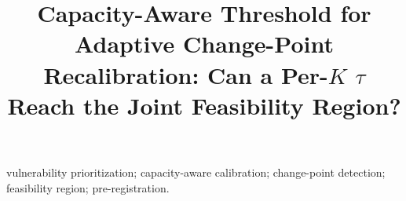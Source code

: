 \documentclass[journal]{IEEEtran}
\title{Capacity-Aware Threshold for Adaptive Change-Point
Recalibration: Can a Per-$K$ $\tau$ Reach the Joint Feasibility Region?}
\author{%
  \IEEEauthorblockN{Harshavardhan Malla}
  \IEEEauthorblockA{Independent Researcher}%
}
\begin{document}
\maketitle

\begin{abstract}

\end{abstract}

\begin{IEEEkeywords}
vulnerability prioritization; capacity-aware calibration; change-point
detection; feasibility region; pre-registration.
\end{IEEEkeywords}















\end{document}
